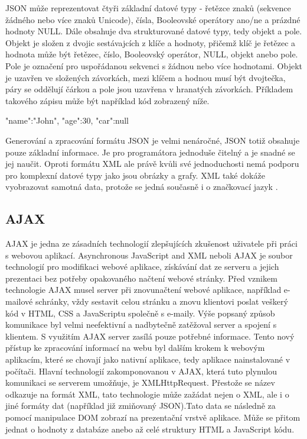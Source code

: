 JSON může reprezentovat čtyři základní datové typy - řetězce znaků (sekvence žádného nebo více znaků Unicode), čísla, Booleovské operátory ano/ne a prázdné hodnoty NULL. Dále obsahuje dva strukturované datové typy, tedy objekt a pole. Objekt je složen z dvojic sestávajcích z klíče a hodnoty, přičemž klíč je řetězec a hodnota může být řetězec, číslo, Booleovský operátor, NULL, objekt anebo pole. Pole je označení pro uspořádanou sekvenci s žádnou nebo více hodnotami. Objekt je uzavřen ve složených závorkách, mezi klíčem a hodnou musí být dvojtečka, páry se oddělují čárkou a pole jsou uzavřena v hranatých závorkách. Příkladem takového zápisu může být například kód zobrazený níže.

{"name":"John", "age":30, "car":null}

Generování a zpracování formátu JSON je velmi nenáročné, JSON totiž obsahuje pouze základní informace. Je pro programátora jednoduše čitelný a je snadné se jej naučit. Oproti formátu XML ale právě kvůli své jednoduchosti nemá podporu pro komplexní datové typy jako jsou obrázky a grafy. XML také dokáže vyobrazovat samotná data, protože se jedná současně i o značkovací jazyk \cite{introjson}.

        \subsection{AJAX}
AJAX je jedna ze zásadních technologií zlepšujících zkušenost uživatele při práci s webovou aplikací. Asynchronous JavaScript and XML neboli AJAX je soubor technologií pro modifikaci webové aplikace, získávání dat ze serveru a jejich prezentaci bez potřeby opakovaného načtení webové stránky. Před vznikem technologie AJAX musel server při znovunačtení webové aplikace, například e-mailové schránky, vždy sestavit celou stránku a znovu klientovi poslat veškerý kód v HTML, CSS a JavaScriptu společně s e-maily. Výše popsaný způsob komunikace byl velmi neefektivní a nadbytečně zatěžoval server a spojení s klientem. S využitím AJAX server zasílá pouze potřebné informace. Tento nový přístup ke zpracování informací na webu byl dalším krokem k webovým aplikacím, které se chovají jako nativní aplikace, tedy aplikace nainstalované v počítači. Hlavní technologií zakomponovanou v AJAX, která tuto plynulou komunikaci se serverem umožňuje, je XMLHttpRequest. Přestože se název odkazuje na formát XML, tato technologie může zažádat nejen o XML, ale i o jiné formáty dat (například již zmiňovaný JSON).Tato data se následně za pomocí manipulace DOM zobrazí na prezentační vrstvě aplikace. Může se přitom jednat o hodnoty z databáze anebo až celé struktury HTML a JavaScript kódu.\cite{ajax}

